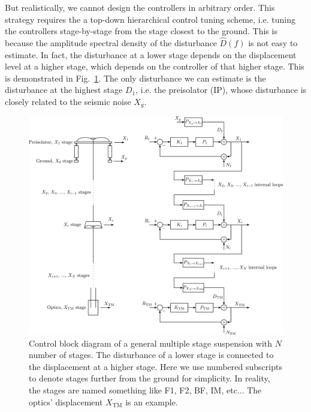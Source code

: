 But realistically, we cannot design the controllers in arbitrary order.
This strategy requires the a top-down hierarchical control tuning scheme, i.e. tuning the controllers stage-by-stage from the stage closest to the ground.
This is because the amplitude spectral density of the disturbance $\hat{D}(f)$ is not easy to estimate.
In fact, the disturbance at a lower stage depends on the displacement level at a higher stage, which depends on the controller of that higher stage.
This is demonstrated in Fig.~\ref{fig:hierarhicalcontrolblockdiagram}.
The only disturbance we can estimate is the disturbance at the highest stage $D_1$, i.e. the preisolator (IP), whose disturbance is closely related to the seismic noise $X_g$.
\begin{figure}[!h]
	\centering
	\includegraphics[width=187mm]{figures/hierarhical_control_block_diagram}
	\caption{Control block diagram of a general multiple stage suspension with $N$ number of stages. The disturbance of a lower stage is connected to the displacement at a higher stage. Here we use numbered subscripts to denote stages further from the ground for simplicity. In reality, the stages are named something like F1, F2, BF, IM, etc... The optics' displacement $X_\mathrm{TM}$ is an example.}
	\label{fig:hierarhicalcontrolblockdiagram}
\end{figure}

